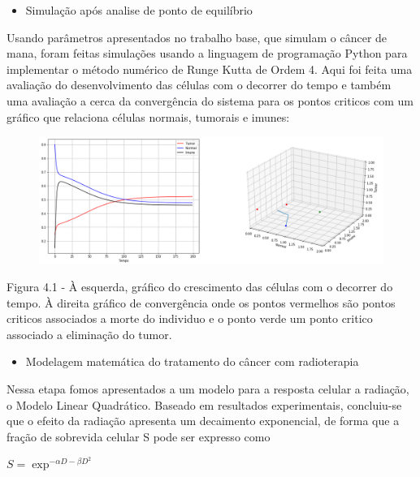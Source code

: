 \documentclass[12pt, a4paper]{article}
\begin{document}
\begin{itemize}
\item Simulação após analise de ponto de equilíbrio
\end{itemize}

Usando parâmetros apresentados no trabalho base, que simulam o câncer de mana, foram feitas simulações usando a linguagem de programação Python para implementar o método numérico de Runge Kutta de Ordem 4. Aqui foi feita uma avaliação do desenvolvimento das células com o decorrer do tempo e também uma avaliação a cerca da convergência do sistema para os pontos criticos com um gráfico que relaciona células normais, tumorais e imunes:

\newpage

\begin{center}
\begin{figure}[tbh!]
	\centering
    \includegraphics[scale=0.4]{imgs/plot_1.png}

  \end{figure}

Figura 4.1 - À esquerda, gráfico do crescimento das células com o decorrer do tempo. À direita gráfico de convergência onde os pontos vermelhos são pontos criticos associados a morte do individuo e o ponto verde um ponto critico associado a eliminação do tumor.
\end{center}


\begin{itemize}
\item Modelagem matemática do tratamento do câncer com radioterapia 
\end{itemize}

Nessa etapa fomos apresentados a um modelo para a resposta celular a radiação, o Modelo Linear Quadrático. Baseado em resultados experimentais, concluiu-se que o efeito da radiação apresenta um decaimento exponencial, de forma que a fração de sobrevida celular S pode ser expresso como
\begin{center}
$S = \exp^{-\alpha D - \beta D^2}$
\end{center}
\end{document}
